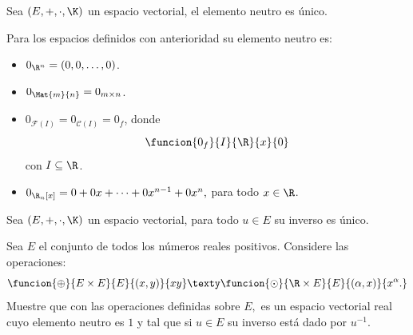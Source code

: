 \documentclass[compacto,10pt]{pubciencias-notas}
\begin{document}
\begin{prop}
Sea $(E, +, \cdot, \K)$ un espacio vectorial, el elemento neutro es único.
\end{prop}

\begin{ejem}\hspace{0pt} Para los espacios definidos con anterioridad su elemento neutro es:
\begin{itemize}
\item $0_{\R^{n}} = (0, 0, \ldots, 0)$.
\item $0_{\Mat{m}{n}} = 0_{m \times n}$.
\item $0_{\mathcal{F}(I)} = 0_{\mathcal{C}(I)} = 0_{f}$, donde
\[
    \funcion{0_{f}}{I}{\R}{x}{0}
\]
con $I\subseteq\R$.
\item $0_{\R_{n}[x]} = 0 + 0x + \cdots + 0x^{n-1} + 0x^{n},$ para todo $x\in\R$.
\end{itemize}
\end{ejem}

\begin{prop}
Sea $(E, +, \cdot, \K)$ un espacio vectorial, para todo $u\in E$ su inverso es único.
\end{prop}

\begin{ejer}\hspace{0pt} Sea $E$ el conjunto de todos los números reales positivos. Considere las operaciones:
\[
    \funcion{\oplus}{E \times E}{E}{(x, y)}{xy}
    \texty
    \funcion{\odot}{\R \times E}{E}{(\alpha, x)}{x^{\alpha}.}
\]
Muestre que con las operaciones definidas sobre $E,$ es un espacio vectorial real cuyo elemento neutro es $1$ y tal que si $u\in E$ su inverso está dado por $u^{-1}$.
\end{ejer}
\end{document}
